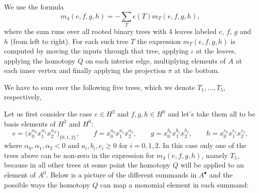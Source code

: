 \documentclass[10pt,a4paper]{amsart}
\numberwithin{equation}{section}
\begin{document}
We use the formula
\[
m_4(e,f,g,h)=-\sum_{T}\epsilon(T)m_T(e,f,g,h),
\]
where the sum runs over all rooted binary trees with 4 leaves labeled $e$, $f$, $g$ and $h$ (from left to right). For each such tree $T$ the expression $m_T(e,f,g,h)$ is computed by moving the inputs through that tree, applying $\iota$ at the leaves, applying the homotopy $Q$ on each interior edge, multiplying elements of $A$ at each inner vertex and finally applying the projection $\pi$ at the bottom.

We have to sum over the following five trees, which we denote $T_1,\dots ,T_5$, respectively,

\begin{center}\quad{}\quad{}\quad{}\quad{}
\end{center}
Let us first consider the case $e\in H^2$ and $f,g,h\in H^0$ and let's take them all to be basis elements of $H^2$ and $H^0$:
\[
e=\big(x_0^{\alpha_0} x_1^{\alpha_1} x_2^{\alpha_2}\big)_{\{0,1,2\}}, \qquad f=x_0^{a_0}x_1^{a_1}x_2^{a_2}, \qquad g=x_0^{b_0}x_1^{b_1}x_2^{b_2}, \qquad h=x_0^{c_0}x_1^{c_1}x_2^{c_2},
\]
where $\alpha_0,\alpha_1,\alpha_2<0$ and $a_i,b_i,c_i\geq 0$ for $i=0,1,2$. In this case only one of the trees above can be non-zero in the expression for $m_4(e,f,g,h)$, namely $T_5$, because in all other trees at some point the homotopy $Q$ will be applied to an element of $A^0$. Below is a picture of the different summands in $A^\bullet$ and the possible ways the homotopy $Q$ can map a monomial element in each summand:
\end{document}
